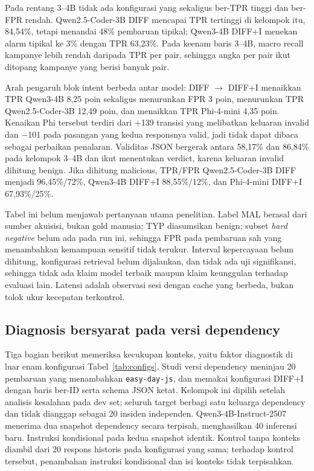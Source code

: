 Pada rentang 3--4B tidak ada konfigurasi yang sekaligus ber-TPR tinggi dan
ber-FPR rendah. Qwen2.5-Coder-3B DIFF mencapai TPR tertinggi di kelompok itu,
84,54\%, tetapi menandai 48\% pembaruan tipikal; Qwen3-4B DIFF+I menekan alarm
tipikal ke 3\% dengan TPR 63,23\%. Pada keenam baris 3--4B, macro recall
kampanye lebih rendah daripada TPR per pair, sehingga angka per pair ikut
ditopang kampanye yang berisi banyak pair.

Arah pengaruh blok intent berbeda antar model: DIFF $\rightarrow$ DIFF+I
menaikkan TPR Qwen3-4B 8,25 poin sekaligus menurunkan FPR 3 poin, menurunkan
TPR Qwen2.5-Coder-3B 12,49 poin, dan menaikkan TPR Phi-4-mini 4,35 poin.
Kenaikan Phi tersebut terdiri dari $+$139 transisi yang melibatkan keluaran
invalid dan $-$101 pada pasangan yang kedua responsnya valid, jadi tidak dapat
dibaca sebagai perbaikan penalaran. Validitas JSON bergerak antara 58,17\% dan
86,84\% pada kelompok 3--4B dan ikut menentukan verdict, karena keluaran
invalid dihitung benign. Jika dihitung malicious, TPR/FPR Qwen2.5-Coder-3B DIFF
menjadi 96,45\%/72\%, Qwen3-4B DIFF+I 88,55\%/12\%, dan Phi-4-mini DIFF+I
67,93\%/25\%.

Tabel ini belum menjawab pertanyaan utama penelitian. Label MAL berasal dari
sumber akuisisi, bukan gold manusia; TYP diasumsikan benign; subset
\emph{hard negative} belum ada pada run ini, sehingga FPR pada pembaruan sah
yang menambahkan kemampuan sensitif tidak terukur. Interval kepercayaan belum
dihitung, konfigurasi retrieval belum dijalankan, dan tidak ada uji
signifikansi, sehingga tidak ada klaim model terbaik maupun klaim keunggulan
terhadap evaluasi lain. Latensi adalah observasi sesi dengan cache yang
berbeda, bukan tolok ukur kecepatan terkontrol.

\subsection{Diagnosis bersyarat pada versi dependency}
\label{sec:dependency-diagnosis}

Tiga bagian berikut memeriksa kecukupan konteks, yaitu faktor diagnostik di
luar enam konfigurasi Tabel~\ref{tab:configs}. Studi versi dependency meninjau
20 pembaruan yang menambahkan \texttt{easy-day-js}, dan memakai konfigurasi
DIFF+I dengan baris ber-ID serta schema JSON ketat. Kelompok ini dipilih
setelah analisis kesalahan pada dev set; seluruh target berbagi satu keluarga
dependency dan tidak dianggap sebagai 20 insiden independen.
Qwen3-4B-Instruct-2507 menerima dua snapshot dependency secara terpisah,
menghasilkan 40 inferensi baru. Instruksi kondisional pada kedua snapshot
identik. Kontrol tanpa konteks diambil dari 20 respons historis pada
konfigurasi yang sama; terhadap kontrol tersebut, penambahan instruksi
kondisional dan isi konteks tidak terpisahkan.

